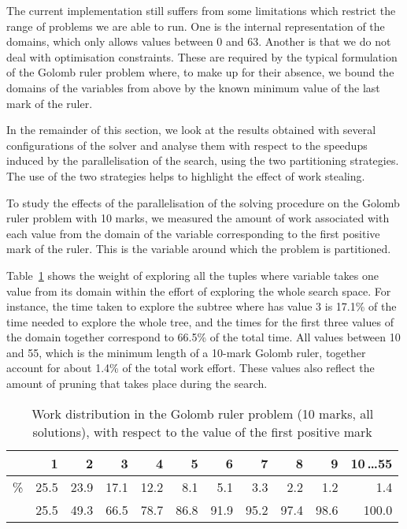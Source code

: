\documentclass{llncs}
\begin{document}
The current implementation still suffers from some limitations which
restrict the range of problems we are able to run. One is the internal
representation of the domains, which only allows values between 0 and
63. Another is that we do not deal with optimisation constraints.
These are required by the typical formulation of the Golomb ruler
problem where, to make up for their absence, we bound the domains of
the variables from above by the known minimum value of the last mark
of the ruler.

In the remainder of this section, we look at the results obtained with
several configurations of the solver and analyse them with respect to
the speedups induced by the parallelisation of the search, using the
two partitioning strategies. The use of the two strategies helps to
highlight the effect of work stealing.

To study the effects of the parallelisation of the solving procedure
on the Golomb ruler problem with 10 marks, we measured the amount of
work associated with each value from the domain of the variable 
corresponding to the first positive mark of the ruler. This is the
variable around which the problem is partitioned.

Table~\ref{tab:golomb:work} shows the weight of exploring all the
tuples where variable  takes one value from its domain within the
effort of exploring the whole search space. For instance, the time
taken to explore the subtree where  has value 3 is 17.1\% of the
time needed to explore the whole tree, and the times for the first
three values of the domain together correspond to 66.5\% of the total
time. All values between 10 and 55, which is the minimum length of a
10-mark Golomb ruler, together account for about 1.4\% of the total
work effort. These values also reflect the amount of pruning that
takes place during the search.

\begin{table}[ht]
  \centering
  \caption{Work distribution in the Golomb ruler problem (10 marks, all
    solutions), with respect to the value of the first positive mark}
  \label{tab:golomb:work}
  \begin{tabular}{c|*{10}{r|}}
 & 1    & 2    & 3    & 4    & 5    & 6    & 7    & 8    & 9    & 10\,\ldots 55 \\ \hline
    \%    & 25.5 & 23.9 & 17.1 & 12.2 &  8.1 &  5.1 &  3.3 &  2.2 &  1.2 &   1.4         \\ \hline
          & 25.5 & 49.3 & 66.5 & 78.7 & 86.8 & 91.9 & 95.2 & 97.4 & 98.6 & 100.0         \\ \cline{2-11}
  \end{tabular}
\end{table}
\end{document}

